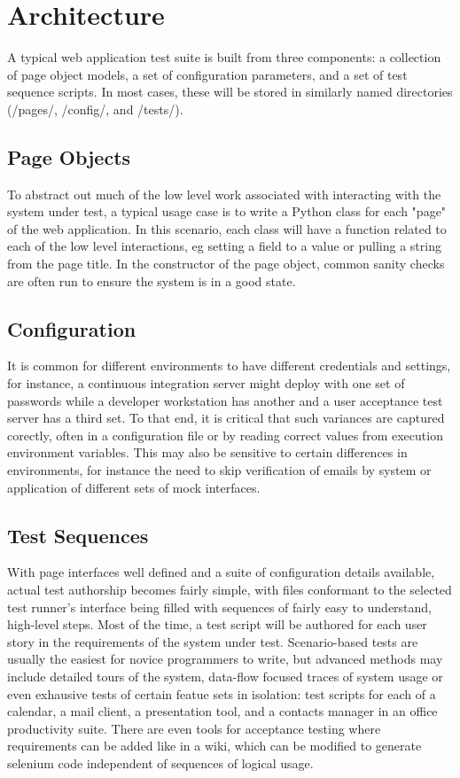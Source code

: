 \section{Architecture}
A typical web application test suite is built from three components: a collection of page object models, a set of configuration parameters, and a set of test sequence scripts. In most cases, these will be stored in similarly named directories (/pages/, /config/, and /tests/).\citep{leotta2013improving}

\subsection{Page Objects}
To abstract out much of the low level work associated with interacting with the system under test, a typical usage case is to write a Python class for each "page" of the web application.\citep{kung2000object} In this scenario, each class will have a function related to each of the low level interactions, eg setting a field to a value or pulling a string from the page title. In the constructor of the page object, common sanity checks are often run to ensure the system is in a good state.

\subsection{Configuration}
It is common for different environments to have different credentials and settings, for instance, a continuous integration server might deploy with one set of passwords while a developer workstation has another and a user acceptance test server has a third set. To that end, it is critical that such variances are captured corectly, often in a configuration file or by reading correct values from execution environment variables.\citep{marchetto2008state} This may also be sensitive to certain differences in environments, for instance the need to skip verification of emails by system or application of different sets of mock interfaces.

\subsection{Test Sequences}
With page interfaces well defined and a suite of configuration details available, actual test authorship becomes fairly simple, with files conformant to the selected test runner's interface being filled with sequences of fairly easy to understand, high-level steps. Most of the time, a test script will be authored for each user story in the requirements of the system under test. Scenario-based tests are usually the easiest for novice programmers to write, but advanced methods may include detailed tours of the system, data-flow focused traces of system usage\citep{liu2000object} or even exhausive tests of certain featue sets in isolation: test scripts for each of a calendar, a mail client, a presentation tool, and a contacts manager in an office productivity suite. There are even tools for acceptance testing where requirements can be added like in a wiki, which can be modified to generate selenium code independent of sequences of logical usage.\citep{wang2009build}

